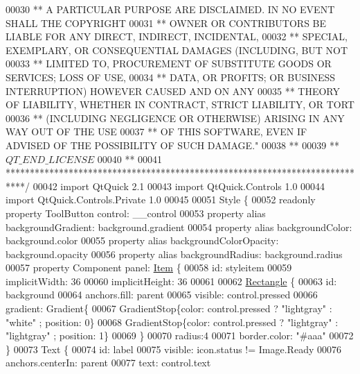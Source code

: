 \begin{DoxyCode}
00030 \textcolor{stringliteral}{** A PARTICULAR PURPOSE ARE DISCLAIMED. IN NO EVENT SHALL THE COPYRIGHT}
00031 \textcolor{stringliteral}{** OWNER OR CONTRIBUTORS BE LIABLE FOR ANY DIRECT, INDIRECT, INCIDENTAL,}
00032 \textcolor{stringliteral}{** SPECIAL, EXEMPLARY, OR CONSEQUENTIAL DAMAGES (INCLUDING, BUT NOT}
00033 \textcolor{stringliteral}{** LIMITED TO, PROCUREMENT OF SUBSTITUTE GOODS OR SERVICES; LOSS OF USE,}
00034 \textcolor{stringliteral}{** DATA, OR PROFITS; OR BUSINESS INTERRUPTION) HOWEVER CAUSED AND ON ANY}
00035 \textcolor{stringliteral}{** THEORY OF LIABILITY, WHETHER IN CONTRACT, STRICT LIABILITY, OR TORT}
00036 \textcolor{stringliteral}{** (INCLUDING NEGLIGENCE OR OTHERWISE) ARISING IN ANY WAY OUT OF THE USE}
00037 \textcolor{stringliteral}{** OF THIS SOFTWARE, EVEN IF ADVISED OF THE POSSIBILITY OF SUCH DAMAGE."}
00038 **
00039 ** $QT\_END\_LICENSE$
00040 **
00041 ****************************************************************************/
00042 \textcolor{keyword}{import} QtQuick 2.1
00043 import QtQuick.Controls 1.0
00044 import QtQuick.Controls.Private 1.0
00045 
00051 Style \{
00052     readonly \textcolor{keyword}{property} ToolButton control: \_\_control
00053     \textcolor{keyword}{property} alias backgroundGradient: background.gradient
00054     \textcolor{keyword}{property} alias backgroundColor: background.color
00055     \textcolor{keyword}{property} alias backgroundColorOpacity: background.opacity
00056     \textcolor{keyword}{property} alias backgroundRadius: background.radius
00057     \textcolor{keyword}{property} Component panel: \hyperlink{classItem}{Item} \{
00058         \textcolor{keywordtype}{id}: styleitem
00059         implicitWidth: 36
00060         implicitHeight: 36
00061 
00062         \hyperlink{classRectangle}{Rectangle} \{
00063             \textcolor{keywordtype}{id}: background
00064             anchors.fill: parent
00065             visible: control.pressed
00066             gradient: Gradient\{
00067                 GradientStop\{color: control.pressed ? \textcolor{stringliteral}{"lightgray"} : \textcolor{stringliteral}{"white"} ; position: 0\}
00068                 GradientStop\{color: control.pressed ? \textcolor{stringliteral}{"lightgray"} : \textcolor{stringliteral}{"lightgray"} ; position: 1\}
00069             \}
00070             radius:4
00071             border.color: \textcolor{stringliteral}{"#aaa"}
00072         \}
00073         Text \{
00074             \textcolor{keywordtype}{id}: label
00075             visible: icon.status != Image.Ready
00076             anchors.centerIn: parent
00077             text: control.text

\end{DoxyCode}
